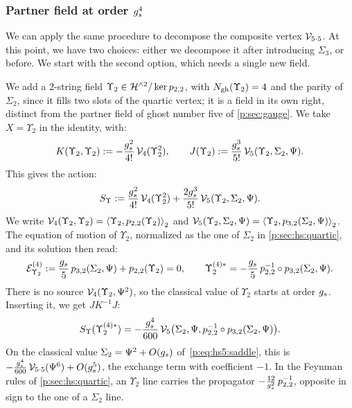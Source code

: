 \subsubsection{Partner field at order \texorpdfstring{$\gs^4$}{gs4}}

We can apply the same procedure to decompose the composite vertex $\vertex{5 \cdot 5}$.
  At this point, we have two choices: either we decompose it after introducing $\Sigma_3$, or before.
  We start with the second option, which needs a single new field.

We add a $2$-string field $\Upsilon_2 \in \Hn{2} / \ker \sprod{2}{2}$, with $\Ngh(\Upsilon_2) = 4$ and the parity of $\Sigma_2$, since it fills two slots of the quartic vertex; it is a field in its own right, distinct from the partner field of ghost number five of \cref{p:sec:gauge}.
  We take $X = \Upsilon_2$ in the identity, with:
  \begin{equation}
  K(\Upsilon_2, \Upsilon_2)
    := - \frac{\gs^2}{4!} \, \vertex{4}(\Upsilon_2^2),
  \qquad
  J(\Upsilon_2)
    := \frac{\gs^3}{5!} \, \vertex{5}(\Upsilon_2, \Sigma_2, \Psi).
\end{equation}
  This gives the action:
  \begin{equation}
  \label{p:eq:wsp:partner-action}
  S_{\Upsilon}
    := \frac{\gs^2}{4!} \, \vertex{4}(\Upsilon_2^2)
      + \frac{2 \gs^3}{5!} \, \vertex{5}(\Upsilon_2, \Sigma_2, \Psi).
\end{equation}
  We write $\vertex{4}(\Upsilon_2, \Upsilon_2) = \pair[2]{\Upsilon_2}{\sprod{2}{2}(\Upsilon_2)}$ and $\vertex{5}(\Upsilon_2, \Sigma_2, \Psi) = \pair[2]{\Upsilon_2}{\sprod{3}{2}(\Sigma_2, \Psi)}$.
  The equation of motion of $\Upsilon_2$, normalized as the one of $\Sigma_2$ in \cref{p:sec:hs:quartic}, and its solution then read:
  \begin{equation}
  \label{p:eq:wsp:saddle}
  \mathcal{E}^{(4)}_{\Upsilon_2}
    := \frac{\gs}{5} \, \sprod{3}{2}(\Sigma_2, \Psi)
      + \sprod{2}{2}(\Upsilon_2)
    = 0,
  \qquad
  \Upsilon_2^{(4)*}
    = - \frac{\gs}{5} \, \sprod{2}{2}^{-1} \circ \sprod{3}{2}(\Sigma_2, \Psi).
\end{equation}
  There is no source $\vertex{4}(\Upsilon_2, \Psi^2)$, so the classical value of $\Upsilon_2$ starts at order $\gs$.
  Inserting it, we get $J K^{-1} J$:
  \begin{equation}
  \label{p:eq:wsp:eliminated}
  S_{\Upsilon}(\Upsilon_2^{(4)*})
    = - \frac{\gs^4}{600} \, \vertex{5}\big(\Sigma_2, \Psi, \sprod{2}{2}^{-1} \circ \sprod{3}{2}(\Sigma_2, \Psi)\big).
\end{equation}
  On the classical value $\Sigma_2 = \Psi^2 + O(\gs)$ of~\eqref{p:eq:hs5:saddle}, this is $- \frac{\gs^4}{600} \, \vertex{5 \cdot 5}(\Psi^6) + O(\gs^5)$, the exchange term with coefficient $- 1$.
  In the Feynman rules of \cref{p:sec:hs:quartic}, an $\Upsilon_2$ line carries the propagator $- \frac{12}{\gs^2} \, \sprod{2}{2}^{-1}$, opposite in sign to the one of a $\Sigma_2$ line.

